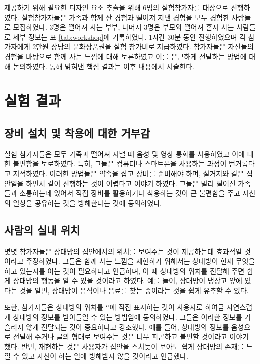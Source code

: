 \concept\을 제공하기 위해 필요한 디자인 요소 추출을 위해 6명의 실험참가자를 대상으로 \expWorkshop\을 진행하였다. 실험참가자들은 가족과 함께 산 경험과 떨어져 지낸 경험을 모두 경험한 사람들로 모집하였다. 3명은 떨어져 사는 부부, 나머지 3명은 부모와 떨어져 혼자 사는 사람들로 세부 정보는 표 \ref{tab:workshop}에 기록하였다. \expWorkshop\은 1시간 30분 동안 진행하였으며 각 참가자에게 2만원 상당의 문화상품권을 실험 참가비로 지급하였다. 참가자들은 자신들의 경험을 바탕으로 함께 사는 느낌에 대해 토론하였고 이를 은근하게 전달하는 방법에 대해 논의하였다.
\expWorkshop\을 통해 밝혀낸 핵심 결과는 이후 내용에서 서술한다.


\section{실험 결과}
\subsection{장비 설치 및 착용에 대한 거부감}

실험 참가자들은 모두 가족과 떨어져 지낼 때 음성 및 영상 통화를 사용하였고 이에 대한 불편함을 토로하였다. 특히, 그들은 컴퓨터나 스마트폰을 사용하는 과정이 번거롭다고 지적하였다. 이러한 방법들은 약속을 잡고 장비를 준비해야 하며, 설거지와 같은 집안일을 하면서 같이 진행하는 것이 어렵다고 이야기 하였다. 그들은 멀리 떨어진 가족들과 소통하는데 있어서 직접 장비를 활용하거나 착용하는 것이 큰 불편함을 주고 자신의 일상을 공유하는 것을 방해한다는 것에 동의하였다.

\subsection{사람의 실내 위치}

몇몇 참가자들은 상대방의 집안에서의 위치를 보여주는 것이 \concept\을 제공하는데 효과적일 것이라고 주장하였다. 그들은 함께 사는 느낌을 재현하기 위해서는 상대방이 현재 무엇을 하고 있는지를 아는 것이 필요하다고 언급하며, 이 때 상대방의 위치를 전달해 주면 쉽게 상대방의 행동을 알 수 있을 것이라고 하였다. 예를 들어, 상대방이 냉장고 앞에 있다는 것을 알면, 상대방이 음식이나 음료를 찾는 중이라는 것을 쉽게 유추할 수 있다.

또한, 참가자들은 상대방의 위치를 `\location'에 직접 표시하는 것이 사용자로 하여금 자연스럽게 상대방의 정보를 받아들일 수 있는 방법임에 동의하였다. 그들은 이러한 정보를 거슬리지 않게 전달되는 것이 중요하다고 강조했다. 예를 들어, 상대방의 정보를 음성으로 전달해 주거나 글의 형태로 보여주는 것은 너무 피곤하고 불편할 것이라고 이야기 했다. 반면, \location\를 재현하는 것은 사용자가 집안을 스치듯이 보아도 쉽게 상대방의 존재를 느낄 수 있고 자신이 하는 일에 방해받지 않을 것이라고 언급했다.

